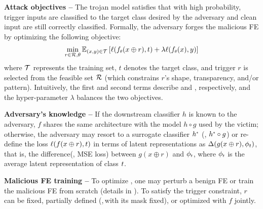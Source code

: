 \documentclass[compsoc,conference,a4paper,10pt,times]{IEEEtran}
\begin{document}
\vspace{2pt}
{\bf Attack objectives --} The trojan model satisfies that with high probability,  trigger inputs are classified to the target class desired by the adversary and  clean input are still correctly classified.
Formally, the adversary forges the malicious FE by optimizing the following objective:
\begin{align}
\label{eq:opt}
\min_{r \in \gR, \theta} \sE_{(x,y) \in \mathcal{T}}\left[ \ell( \ssub{f}{\theta}(x \oplus r), \ay)  + \lambda \ell( \ssub{f}{\theta}(x), y) \right]
\end{align}
where ${\mathcal{T}}$ represents the training set, $t$ denotes the target class, and trigger $r$ is selected from the feasible set ${\mathcal{R}}$ (which constrains $r$'s shape, transparency, and/or pattern). Intuitively, the first and second terms describe  and , respectively, and the hyper-parameter $\lambda$ balances the two objectives.

\vspace{2pt}
{\bf Adversary's knowledge --} If the downstream classifier $h$ is known to the adversary, $f$ shares the same architecture with the model $h \circ g$ used by the victim; otherwise, the adversary may resort to a surrogate classifier $\ssup{h}{*}$ (\mie, $ \ssup{h}{*} \circ g$) or re-define the loss $\ell(f(x \oplus r), t)$ in terms of latent representations as $\Delta (g(x\oplus r), \phi_t)$, that is, the difference(\meg, MSE loss) between $g(x\oplus r)$ and $\ssub{\phi}{\ay}$, where $\ssub{\phi}{\ay}$ is the average latent representation of class $t$. 

\vspace{2pt}
{\bf Malicious FE training --}
To optimize , one may perturb a benign FE or train the malicious FE from scratch (details in ).
To satisfy the trigger constraint, $r$ can be fixed, partially defined (\meg,\,with its mask fixed), or optimized with $f$ jointly. 
\end{document}
